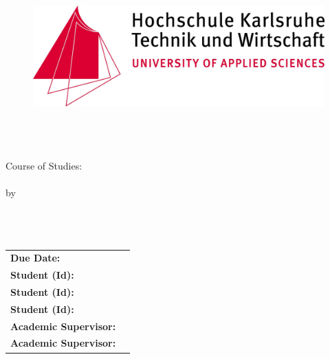 
\begin{titlepage}
	\enlargethispage{4.0cm}

	\begin{center}
		\begin{figure}
			\centering
			\begin{minipage}{.5\textwidth}
				\centering
				\includegraphics[width=\textwidth]{Figures/logo_hs_ka.jpg}
						\vspace{1cm}
			\end{minipage}%
		\end{figure}

		\huge{\textsc{\textbf{\reporttitle}}}\\[1.5ex]
		\Large{\textbf{\reportsubtitle}}\\[4ex]
		\Large{\reporttype}\\[3ex]

		\Large{Course of Studies: \courseofstudies}\\[1ex]
		\normalsize{\hska}\\[2ex]
		by\\ \Large{\textbf{\authorLukas \\ \authorHenning \\ \authorBenjamin}} \\[10ex]
			\normalsize{
			\begin{tabular}{ll}
				\textbf{Due Date:}	    			& \quad \duedate 																	\\
				\textbf{Student (Id):} 				& \quad \authorLukas { (}\matrikelnrLukas{)} 			\\
				\textbf{Student (Id):} 				& \quad \authorHenning { (}\matrikelnrHenning{)} 	\\ 
				\textbf{Student (Id):}				& \quad \authorBenjamin { (}\matrikelnrBenjamin{)} \\
				\textbf{Academic Supervisor:}	& \quad \supervisorLink 													\\
				\textbf{Academic Supervisor:}	& \quad \supervisorSchwab 												\\
			\end{tabular} 
		}
	\end{center}
\end{titlepage}